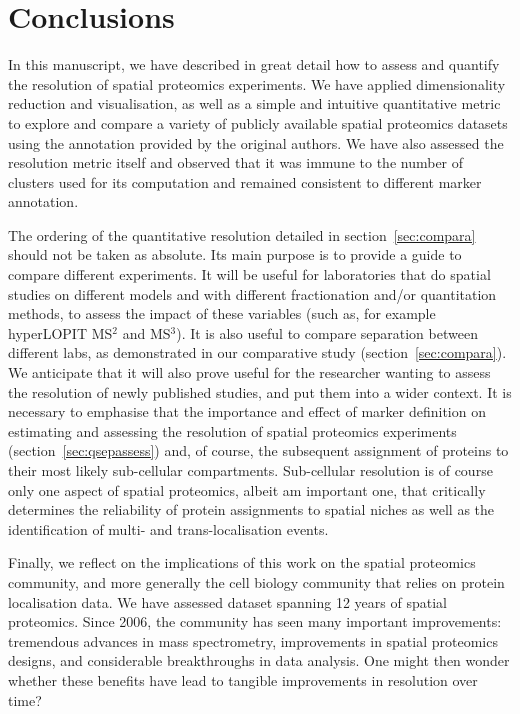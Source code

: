 \documentclass[12pt]{article}\usepackage[]{graphicx}\usepackage[]{color}
\begin{document}
\section{Conclusions}

In this manuscript, we have described in great detail how to assess
and quantify the resolution of spatial proteomics experiments. We have
applied dimensionality reduction and visualisation, as well as a
simple and intuitive quantitative metric to explore and compare a
variety of publicly available spatial proteomics datasets using the
annotation provided by the original authors. We have also assessed the
resolution metric itself and observed that it was immune to the number
of clusters used for its computation and remained consistent to
different marker annotation.

The ordering of the quantitative resolution detailed in
section~\ref{sec:compara} should not be taken as absolute. Its main
purpose is to provide a guide to compare different experiments. It
will be useful for laboratories that do spatial studies on different
models and with different fractionation and/or quantitation methods,
to assess the impact of these variables (such as, for example
hyperLOPIT MS$^2$ and MS$^3$). It is also useful to compare separation
between different labs, as demonstrated in our comparative study
(section~\ref{sec:compara}). We anticipate that it will also prove
useful for the researcher wanting to assess the resolution of newly
published studies, and put them into a wider context. It is necessary
to emphasise that the importance and effect of marker definition on
estimating and assessing the resolution of spatial proteomics
experiments (section~\ref{sec:qsepassess}) and, of course, the
subsequent assignment of proteins to their most likely sub-cellular
compartments. Sub-cellular resolution is of course only one aspect of
spatial proteomics, albeit am important one, that critically
determines the reliability of protein assignments to spatial niches as
well as the identification of multi- and trans-localisation events.

\bigskip

Finally, we reflect on the implications of this work on the spatial
proteomics community, and more generally the cell biology community
that relies on protein localisation data. We have assessed dataset
spanning 12 years of spatial proteomics. Since 2006, the community has
seen many important improvements: tremendous advances in mass
spectrometry, improvements in spatial proteomics designs, and
considerable breakthroughs in data analysis. One might then wonder
whether these benefits have lead to tangible improvements in
resolution over time?
\end{document}
